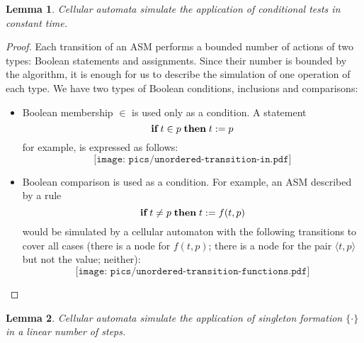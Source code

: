 \documentclass[submission,copyright,creativecommons,english]{eptcs}
\newtheorem{lemma}{Lemma}
\newcommand{\IF}{\mbox{\bf if}\;}
\newcommand{\THEN}{\;\mbox{\bf then}\;}
\begin{document}
 \begin{lemma}
Cellular automata  simulate the application of conditional tests in constant time.
\end{lemma}

\begin{proof}
Each transition of an ASM performs a bounded number of actions of two types:  Boolean statements and assignments.
Since their number is bounded by the algorithm, it is enough for us to describe  the simulation of one operation of each type. 
We have two types of Boolean conditions, inclusions and comparisons:

\begin{itemize}
\item  Boolean membership $\in$ is used only  as a condition. A statement \[\IF t\in p\THEN t:=p\]  for example, is expressed as follows:
\[\texttt{[image: pics/unordered-transition-in.pdf]}\]

\item Boolean comparison is used as a condition. For example, an ASM described by a rule \[\IF t\neq p \THEN t:=f(t,p)\] 
would be simulated by a cellular automaton with the following transitions
{to cover all cases (there is a node for $f(t,p)$; there is a node for the pair $\langle t, p\rangle$ but not the value; neither)}:
\[\texttt{[image: pics/unordered-transition-functions.pdf]}\]
\end{itemize}
\end{proof}

 \begin{lemma}
Cellular automata  simulate the application of singleton formation 
$\{\cdot \}$ in a linear number of steps.
\end{lemma}
\end{document}

